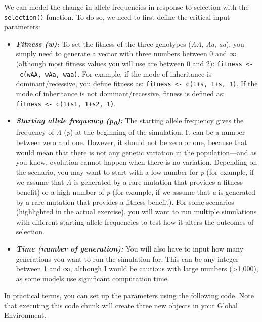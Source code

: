 \documentclass[
]{book}
\begin{document}
We can model the change in allele frequencies in response to selection with the \texttt{selection()} function. To do so, we need to first define the critical input parameters:

\begin{itemize}
\item
  \textbf{\emph{Fitness (w):}} To set the fitness of the three genotypes (\emph{AA}, \emph{Aa}, \emph{aa}), you simply need to generate a vector with three numbers between 0 and ∞ (although most fitness values you will use are between 0 and 2): \texttt{fitness\ \textless{}-\ c(wAA,\ wAa,\ waa)}. For example, if the mode of inheritance is dominant/recessive, you define fitness as: \texttt{fitness\ \textless{}-\ c(1+s,\ 1+s,\ 1)}. If the mode of inheritance is not dominant/recessive, fitness is defined as: \texttt{fitness\ \textless{}-\ c(1+s1,\ 1+s2,\ 1)}.
\item
  \textbf{\emph{Starting allele frequency (p\textsubscript{0}):}} The starting allele frequency gives the frequency of \emph{A} (\emph{p}) at the beginning of the simulation. It can be a number between zero and one. However, it should not be zero or one, because that would mean that there is not any genetic variation in the population---and as you know, evolution cannot happen when there is no variation. Depending on the scenario, you may want to start with a low number for \emph{p} (for example, if we assume that \emph{A} is generated by a rare mutation that provides a fitness benefit) or a high number of \emph{p} (for example, if we assume that \emph{a} is generated by a rare mutation that provides a fitness benefit). For some scenarios (highlighted in the actual exercise), you will want to run multiple simulations with different starting allele frequencies to test how it alters the outcomes of selection.
\item
  \textbf{\emph{Time (number of generation):}} You will also have to input how many generations you want to run the simulation for. This can be any integer between 1 and ∞, although I would be cautious with large numbers (\textgreater1,000), as some models use significant computation time.
\end{itemize}

In practical terms, you can set up the parameters using the following code. Note that executing this code chunk will create three new objects in your Global Environment.
\end{document}
